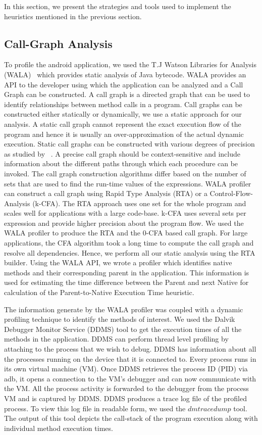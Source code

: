 In this section, we present the strategies and tools used to implement the heuristics mentioned in the previous section.


\subsection{Call-Graph Analysis}
To profile the android application, we used the T.J Watson Libraries for Analysis (WALA)~\cite{wala} which provides static analysis
of Java bytecode. WALA provides an API to the developer using which the application can be analyzed and a Call Graph can be
constructed. A call graph is a directed graph that can be used to identify relationships between method calls in a program.
Call graphs can be constructed either statically or dynamically, we use a static approach for our analysis. A static
call graph cannot represent the exact execution flow of the program and hence it is usually an over-approximation of
the actual dynamic execution. Static call graphs can be constructed with various degrees of precision as studied by
~\cite{cgbuild}. A precise call graph should be context-sensitive and include information about the different paths through which
each procedure can be invoked. The call graph construction algorithms differ based on the number of sets that are used to find the
run-time values of the expressions. WALA profiler can construct a call graph using Rapid Type Analysis (RTA) or a Control-Flow-Analysis
(k-CFA). The RTA approach uses one set for the whole program and scales well for applications with a large code-base. k-CFA uses
several sets per expression and provide higher precision about the program flow.
We used the WALA profiler to produce the RTA and the 0-CFA based call graph. For large applications, the CFA algorithm took a long time to
compute the call graph and resolve all dependencies. Hence, we perform all our static analysis using the RTA builder. Using the WALA API,
we wrote a profiler which identifies native methods and their corresponding parent in the application.
This information is used for estimating the time difference between the Parent and next Native for calculation of the Parent-to-Native Execution
Time heuristic.

The information generate by the WALA profiler was coupled with a dynamic profiling technique to identify the methods of interest.
We used the Dalvik Debugger Monitor Service (DDMS) tool to get the execution times of all the methods in the application. DDMS can perform
thread level profiling by attaching to the process that we wish to debug. DDMS has information about all the processes running on the device
that it is connected to. Every process runs in its own virtual machine (VM). Once DDMS retrieves the process ID (PID) via adb, it opens a
connection to the VM's debugger and can now communicate with the VM. All the process activity is forwarded to the debugger from the process VM
and is captured by DDMS. DDMS produces a trace log file of the profiled process. To view this log file in readable form, we used the
$dmtracedump$ tool. The output of this tool depicts the call-stack of the program execution along with individual method execution times.


